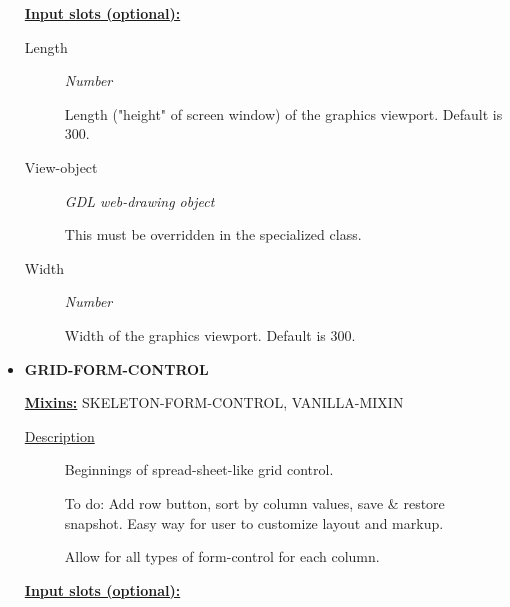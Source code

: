 \documentclass [11pt]{book}
\begin{document}
\begin{itemize}
\textbf{
\underline{Input slots (optional):}}

\begin{description}

\item [Length]
\emph{Number}

 Length ("height" of screen window) of the graphics viewport. Default is 300.




\item [View-object]
\emph{GDL web-drawing object}

 This must be overridden in the specialized class.




\item [Width]
\emph{Number}

 Width of the graphics viewport. Default is 300.




\end{description}







\item {}
\label{prim:grid-form-control}
\textbf{GRID-FORM-CONTROL}


\textbf{
\underline{Mixins:}} SKELETON-FORM-CONTROL, VANILLA-MIXIN





\begin{description}

\item [
\underline{Description}]


Beginnings of spread-sheet-like 
grid control.

To do: Add row button, sort by column values, 
save \& restore snapshot. Easy way for user to 
customize layout and markup.

Allow for all types of form-control for each column.





\end{description}








\textbf{
\underline{Input slots (optional):}}


\end{itemize}
\end{document}
